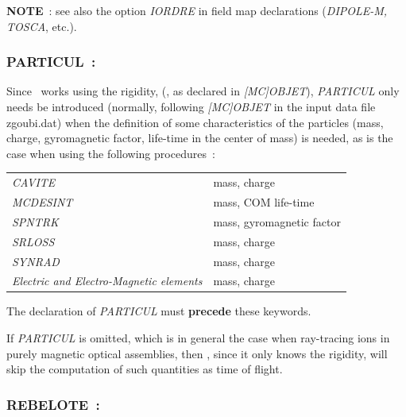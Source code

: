 {\bigskip

\noindent\textbf{NOTE}~: see also the option \textsl{IORDRE} in field map
declarations (\textsl{DIPOLE-M, TOSCA}, etc.).  



 \newpage

\subsubsection{PARTICUL~: \PARTICULTitl}  \label{PARTICUL} 
\medskip 

Since \zgoubi\ works  using the rigidity, (\BORO, as declared in \textsl{[MC]OBJET}), 
\textsl{PARTICUL} only needs  be introduced (normally, following \textsl{[MC]OBJET} in the input data file zgoubi.dat) 
 when  the definition of some characteristics of the particles 
(mass, charge, gyromagnetic factor, life-time in the 
center of mass)  is needed, as is the case when using the following procedures~: 

\bigskip           

\begin{tabular}{>{\sl}l!{~:}l}
  CAVITE    & mass,  charge \\
  MCDESINT  & mass,  COM  life-time\\
  SPNTRK    & mass,  gyromagnetic factor \\
  SRLOSS    & mass, charge \\
  SYNRAD    & mass, charge \\
  Electric and Electro-Magnetic elements
            & mass, charge 
\end{tabular}
\bigskip           

\noindent The declaration of \textsl{PARTICUL} must \textbf{precede} these keywords. 

\medskip

\noindent
If \textsl{PARTICUL} is omitted, which is in general the case when ray-tracing ions
in purely magnetic optical assemblies, then \zgoubi, since it  only knows the rigidity, 
 will  skip the computation of  such quantities as  time of flight. 



 \newpage

\subsubsection{REBELOTE~: \REBELOTETitl} \label{REBELOTE}    
 
\medskip


}
